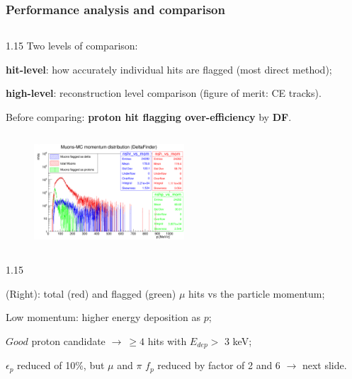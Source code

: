 \documentclass{beamer}
\begin{document}
\begin{frame}
\frametitle{Performance analysis and comparison}
  \begin{columns}
        \begin{column}{1.15\framewidth}
       {\footnotesize Two levels of comparison:}
    \setlength{\leftmargini}{1.2em}
    \begin{itemize}
      {\footnotesize  \item \textbf{hit-level}: how accurately individual hits are flagged (most direct method);
    \item \textbf{high-level}: reconstruction level comparison (figure of merit: CE tracks).
    \vspace{-1mm}
\item Before comparing: \textbf{proton hit flagging over-efficiency} by \textbf{DF}.}
    \end{itemize}
    \end{column}
    \end{columns}
        \vspace{-1mm}
       
        \begin{figure}[!h]
            \centering
            \includegraphics[width =0.5\textwidth]{figures/png/Screenshot_20240805_222923.png}
           \label{fig:0pbarbefore}
        \end{figure}
        
 
    \vspace{-3mm}
    \begin{columns}
        \begin{column}{1.15\framewidth}
    \setlength{\leftmargini}{1.2em}
    \begin{itemize}
      {\footnotesize  
\item (Right): total (red) and flagged (green) $\mu$ hits vs the particle momentum;
\vspace{1mm}
\item Low momentum: higher energy deposition as $p$;
\vspace{1mm}
\item $Good$ proton candidate $\rightarrow \ \geq 4$
hits with $E_{dep} >$ 3 keV; 
\item $\epsilon_p$ reduced of 10\%, but $\mu$ and $\pi$ $f_p$ reduced by factor of 2 and 6 $\rightarrow$ next slide.
}
      \end{itemize}
      \end{column}
      \end{columns}
\end{frame}
\end{document}
